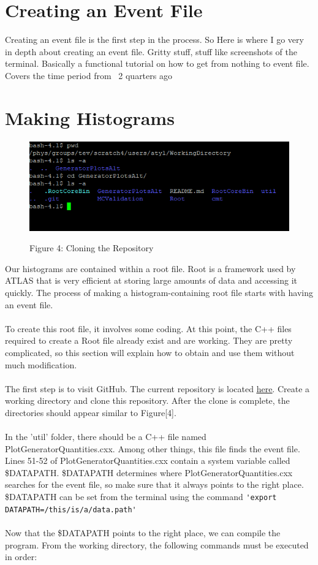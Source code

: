 \documentclass[10pt,a4paper]{report}
\begin{document}
\section*{Creating an Event File}
Creating an event file is the first step in the process. So Here is where I go very in depth about creating an event file. Gritty stuff, stuff like screenshots of the terminal. Basically a functional tutorial on how to get from nothing to event file. Covers the time period from ~2 quarters ago
\section*{Making Histograms}

\begin{figure}
\includegraphics[scale=.4]{Figure4}
\begin{center}
{\scriptsize Figure 4: Cloning the Repository}
\end{center}
\end{figure}

Our histograms are contained within a root file. Root is a framework used by ATLAS that is very efficient at storing large amounts of data and accessing it quickly. The process of making a histogram-containing root file starts with having an event file.\\\\
To create this root file, it involves some coding. At this point, the C++ files required to create a Root file already exist and are working. They are pretty complicated, so this section will explain how to obtain and use them without much modification.\\\\
The first step is to visit GitHub. The current repository is located \href{https://github.com/AtlasWHHV/GeneratorPlotsAlt}{\underline{here}}. Create a working directory and clone this repository. After the clone is complete, the directories should appear similar to Figure[4].\\\\
In the 'util' folder, there should be a C++ file named PlotGeneratorQuantities.cxx. Among other things, this file finds the event file. Lines 51-52 of PlotGeneratorQuantities.cxx contain a system variable called \$DATAPATH. \$DATAPATH determines where PlotGeneratorQuantities.cxx searches for the event file, so make sure that it always points to the right place. \$DATAPATH can be set from the terminal using the command \verb|'export DATAPATH=/this/is/a/data.path'|\\\\
Now that the \$DATAPATH points to the right place, we can compile the program. From the working directory, the following commands must be executed in order:
\end{document}
